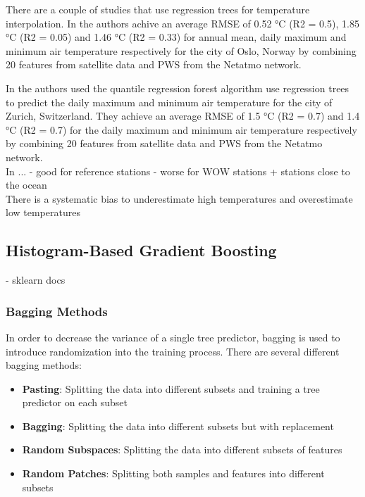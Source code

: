 There are a couple of studies that use regression trees for temperature interpolation. In \cite{venter2020hyperlocal} the authors achive an average RMSE of 0.52 °C (R2 = 0.5), 1.85 °C (R2 = 0.05) and 1.46 °C (R2 = 0.33) for annual mean, daily maximum and minimum air temperature respectively for the city of Oslo, Norway by combining 20 features from satellite data and PWS from the Netatmo network.

In \cite{zumwald2021mapping} the authors used the quantile regression forest algorithm
use regression trees to predict the daily maximum and minimum air temperature for the city of Zurich, Switzerland. They achieve an average RMSE of 1.5 °C (R2 = 0.7) and 1.4 °C (R2 = 0.7) for the daily maximum and minimum air temperature respectively by combining 20 features from satellite data and PWS from the Netatmo network.\\

In \cite{ho2014mapping}... %
- good for reference stations
- worse for WOW stations + stations close to the ocean\\

There is a systematic bias to underestimate high temperatures and overestimate low temperatures~\cite{zumwald2021mapping, zhang2012bias}

\subsection{Histogram-Based Gradient Boosting}

\cite{apaydin2022evaluation}
- sklearn docs

\subsubsection{Bagging Methods}

In order to decrease the variance of a single tree predictor, bagging is used to introduce randomization into the training process. There are several different bagging methods:

\begin{itemize}
    \item \textbf{Pasting}: Splitting the data into different subsets and training a tree predictor on each subset~\cite{breiman1999pasting}
    \item \textbf{Bagging}: Splitting the data into different subsets but with replacement~\cite{breiman1996bagging}
    \item \textbf{Random Subspaces}: Splitting the data into different subsets of features~\cite{ho1998random}
    \item \textbf{Random Patches}: Splitting both samples and features into different subsets~\cite{louppe2012ensembles}
\end{itemize}

